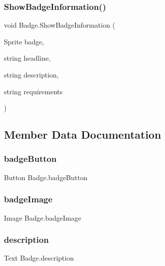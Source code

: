 \subsubsection{\texorpdfstring{Show\+Badge\+Information()}{ShowBadgeInformation()}}
{\footnotesize\ttfamily void Badge.\+Show\+Badge\+Information (\begin{DoxyParamCaption}\item[{Sprite}]{badge,  }\item[{string}]{headline,  }\item[{string}]{description,  }\item[{string}]{requirements }\end{DoxyParamCaption})\hspace{0.3cm}{\ttfamily [inline]}}



\subsection{Member Data Documentation}
\mbox{\label{classBadge_ace9d1cd33c62176b99d96b2254ce3d8d}} 
\subsubsection{\texorpdfstring{badge\+Button}{badgeButton}}
{\footnotesize\ttfamily Button Badge.\+badge\+Button}

\mbox{\label{classBadge_a46b3327e11f63abf7adb1236a123369c}} 
\subsubsection{\texorpdfstring{badge\+Image}{badgeImage}}
{\footnotesize\ttfamily Image Badge.\+badge\+Image}

\mbox{\label{classBadge_aab7be8507723554627a10cb9adbc850c}} 
\subsubsection{\texorpdfstring{description}{description}}
{\footnotesize\ttfamily Text Badge.\+description}

